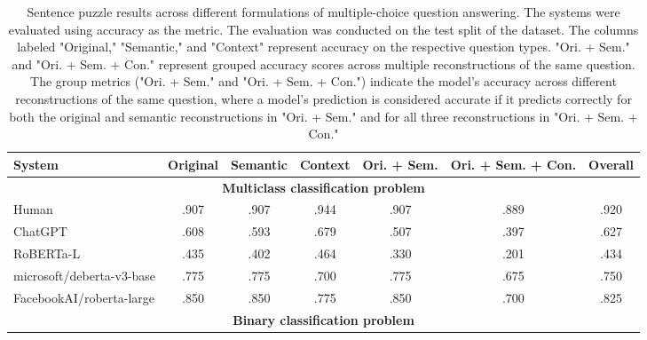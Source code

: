 \singlespacing
\begin{table*}[hbt!]
	\centering
	\footnotesize
	\caption{Sentence puzzle results across different formulations of multiple-choice question answering. The systems were evaluated using accuracy as the metric. The evaluation was conducted on the test split of the dataset. The columns labeled "Original," "Semantic," and "Context" represent accuracy on the respective question types. "Ori. + Sem." and "Ori. + Sem. + Con." represent grouped accuracy scores across multiple reconstructions of the same question. The group metrics ("Ori. + Sem." and "Ori. + Sem. + Con.") indicate the model's accuracy across different reconstructions of the same question, where a model's prediction is considered accurate if it predicts correctly for both the original and semantic reconstructions in "Ori. + Sem." and for all three reconstructions in "Ori. + Sem. + Con."}
	\label{tab:sentence-results-table}
	\begin{center}
		\begin{tabular}{lcccccc}
			\toprule
			\textbf{System}           & \textbf{Original} & \textbf{Semantic} & \textbf{Context} & \textbf{Ori. + Sem.} & \textbf{Ori. + Sem. + Con.} & \textbf{Overall} \\
			\midrule
			\multicolumn{7}{c}{\textbf{Multiclass classification problem}}                                                                                              \\
			\midrule
			\color{gray}Human         & \color{gray}.907  & \color{gray}.907  & \color{gray}.944 & \color{gray}.907     & \color{gray}.889            & \color{gray}.920 \\
			\color{gray}ChatGPT       & \color{gray}.608  & \color{gray}.593  & \color{gray}.679 & \color{gray}.507     & \color{gray}.397            & \color{gray}.627 \\
			\color{gray}RoBERTa-L     & \color{gray}.435  & \color{gray}.402  & \color{gray}.464 & \color{gray}.330     & \color{gray}.201            & \color{gray}.434 \\
			\midrule
			microsoft/deberta-v3-base & .775              & .775              & .700             & .775                 & .675                        & .750             \\
			FacebookAI/roberta-large  & .850              & .850              & .775             & .850                 & .700                        & .825             \\
			\midrule
			\multicolumn{7}{c}{\textbf{Binary classification problem}}                                                                                                   \\

\end{tabular}
\end{center}
\end{table*}
